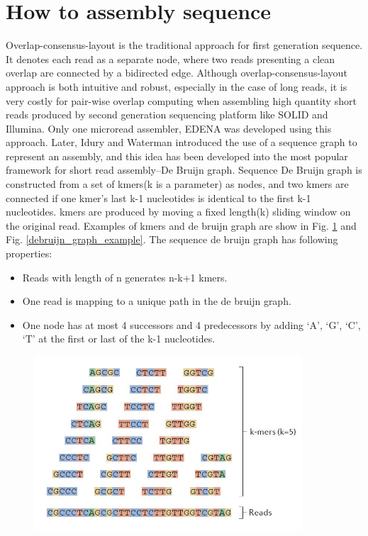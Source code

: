 \documentclass{article}
\begin{document}
\section{How to assembly sequence}
Overlap-consensus-layout \cite{myers1995toward} is the traditional approach for first generation sequence. It denotes each read as a separate node, where two reads presenting a clean overlap are connected by a bidirected edge. Although overlap-consensus-layout approach is both intuitive and robust, especially in the case of long reads, it is very costly for pair-wise overlap computing when assembling high quantity short reads produced by second generation sequencing platform like SOLID and Illumina. Only one microread assembler, EDENA \cite{hernandez2008novo} was developed using this approach. Later, Idury and Waterman \cite{idury1995new} introduced the use of a sequence graph to represent an assembly, and this idea has been developed into the most popular framework for short read assembly--De Bruijn graph. Sequence De Bruijn graph is constructed from a set of kmers(k is a parameter) as nodes, and two kmers are connected if one kmer's last k-1 nucleotides is identical to the first k-1 nucleotides. kmers are produced by moving a fixed length(k) sliding window on the original read. Examples of kmers and de bruijn graph are show in Fig. \ref{kmer_example} and Fig. \ref{debruijn_graph_example}. The sequence de bruijn graph has following properties:
\begin{itemize}
 \item Reads with length of n generates n-k+1 kmers.
 \item One read is mapping to a unique path in the de bruijn graph.
 \item One node has at most 4 successors and 4 predecessors by adding `A', `G', `C', `T' at the first or last of the k-1 nucleotides.
\end{itemize}
\begin{figure}[ht]
  \centering
  \includegraphics[width=10cm]{Figure5.jpg}\\
  \caption{}\label{kmer_example}
\end{figure}
\end{document}
